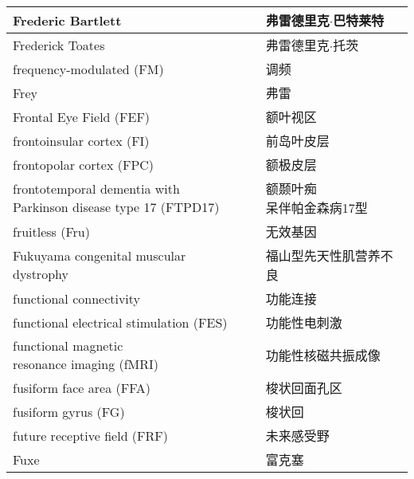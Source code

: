 \begin{longtable}{lll}
	\midrule
	Frederic Bartlett     &&  弗雷德里克$\cdot$巴特莱特  \\
	
	\midrule
	Frederick Toates     &&  弗雷德里克$\cdot$托茨  \\
	
	\midrule
	frequency-modulated (FM)     &&  调频  \\
	
	\midrule
	Frey     &&  弗雷  \\
	
	\midrule
	Frontal Eye Field (FEF)     &&  额叶视区  \\
	
	\midrule
	frontoinsular cortex (FI)     &&  前岛叶皮层  \\
	
	\midrule
	frontopolar cortex (FPC)     &&  额极皮层  \\
	
	\midrule
	\makecell[l]{frontotemporal dementia with \\Parkinson disease type 17 (FTPD17)}     &&  \makecell[l]{额颞叶痴\\呆伴帕金森病17型}  \\
	
	\midrule
	fruitless (Fru)     &&  无效基因  \\
	
	\midrule
	Fukuyama congenital muscular dystrophy     &&  福山型先天性肌营养不良  \\
	
	\midrule
	functional connectivity  && 功能连接
	\\
	
	\midrule
	functional electrical stimulation (FES)     &&  功能性电刺激  \\
	
	\midrule
	\makecell[l]{functional magnetic \\resonance imaging (fMRI)}     &&  功能性核磁共振成像  \\
	
	\midrule
	fusiform face area (FFA)     &&  梭状回面孔区  \\
	
	\midrule
	fusiform gyrus (FG)     &&  梭状回  \\
	
	\midrule
	future receptive field (FRF)    &&  未来感受野  \\
	
	\midrule
	Fuxe     &&  富克塞  \\
	

\end{longtable}
